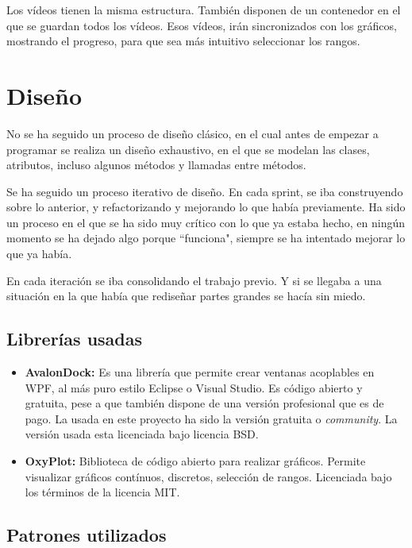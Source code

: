 Los v\'ideos tienen la misma estructura. Tambi\'en disponen de un contenedor en el que se
guardan todos los v\'ideos. Esos v\'ideos, ir\'an sincronizados con los gr\'aficos, mostrando
el progreso, para que sea m\'as intuitivo seleccionar los rangos.

\section{Dise\~{n}o}
No se ha seguido un proceso de dise\~no cl\'asico, en el cual antes de empezar a programar se realiza
un dise\~no exhaustivo, en el que se modelan las clases, atributos, incluso algunos m\'etodos y
llamadas entre m\'etodos.

Se ha seguido un proceso iterativo de dise\~no. En cada sprint, se iba construyendo sobre lo anterior, y refactorizando
y mejorando lo que hab\'ia previamente. Ha sido un proceso en el que se ha sido muy cr\'itico con lo que ya estaba
hecho, en ning\'un momento se ha dejado algo porque ``funciona", siempre se ha intentado mejorar lo que ya hab\'ia.

En cada iteraci\'on se iba consolidando el trabajo previo. Y si se llegaba a una situaci\'on en la que hab\'ia que redise\~nar
partes grandes se hac\'ia sin miedo.

\subsection{Librer\'{i}as usadas}
\begin{itemize}
    \item \textbf{AvalonDock:} 
    Es una librer\'{i}a que permite crear ventanas acoplables en WPF, al m\'as puro estilo Eclipse o Visual Studio. Es
    c\'{o}digo abierto y gratuita, pese a que tambi\'{e}n dispone de una versi\'{o}n profesional que es de pago. La usada en este proyecto
    ha sido la versi\'{o}n gratuita o \emph{community}. La versi\'{o}n usada esta licenciada bajo licencia BSD.
    \item \textbf{OxyPlot:}
    Biblioteca de c\'odigo abierto para realizar gr\'aficos. Permite visualizar gr\'aficos cont\'inuos, discretos, 
    selecci\'on de rangos. Licenciada bajo los t\'erminos de la licencia MIT.
\end{itemize}

\subsection{Patrones utilizados}

